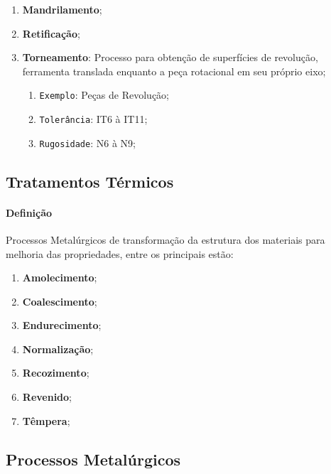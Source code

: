 \documentclass{article}
\begin{document}
\begin{enumerate}[rightmargin = \leftmargin]
                    \item \textbf{Mandrilamento};

                    \item \textbf{Retificação};

                    \item \textbf{Torneamento}: Processo para obtenção de superfícies de revolução, ferramenta translada enquanto a peça rotacional em seu próprio eixo;
                        \begin{enumerate}[rightmargin = \leftmargin, noitemsep]
                            \item \texttt{Exemplo}: Peças de Revolução;
                            \item \texttt{Tolerância}: IT6 à IT11; 
                            \item \texttt{Rugosidade}: N6 à N9; 
                        \end{enumerate}
                \end{enumerate}

        \subsection{Tratamentos Térmicos}
            \paragraph{Definição}Processos Metalúrgicos de transformação da estrutura dos materiais para melhoria das propriedades, entre os principais estão:
                \begin{enumerate}[rightmargin = \leftmargin, noitemsep]
                    \item \textbf{Amolecimento};
                    \item \textbf{Coalescimento};
                    \item \textbf{Endurecimento};
                    \item \textbf{Normalização};
                    \item \textbf{Recozimento};
                    \item \textbf{Revenido};
                    \item \textbf{Têmpera};
                \end{enumerate}

        \subsection{Processos Metalúrgicos}
\end{document}
